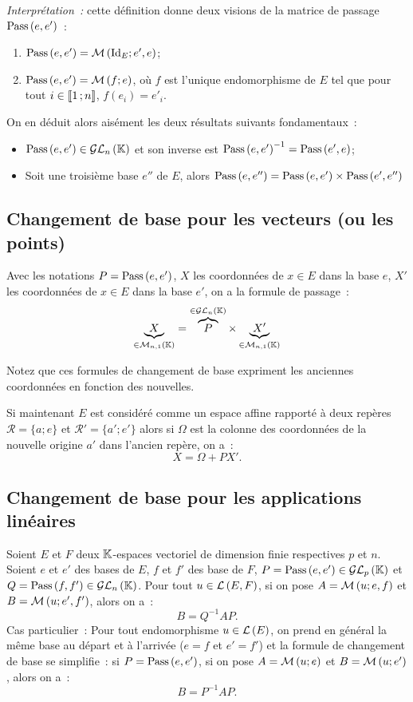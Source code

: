 \emph{Interprétation~:} cette définition donne deux visions de la matrice de passage $\text{Pass}\left(e,e'\right)$~:
\begin{enumerate}
	\item $\text{Pass}\left(e,e'\right) = \mathcal{M}\left(\operatorname{Id}_E;e',e\right)$;
	\item $\text{Pass}\left(e,e'\right) = \mathcal{M}\left(f;e\right)$, où $f$ est l'unique endomorphisme de $E$ tel que pour tout $i \in \mathopen{\llbracket}1\mathclose{}\mathpunct{};n\mathclose{\rrbracket}$, $f(e_i)=e'_i$.
\end{enumerate}

On en déduit alors aisément les deux résultats suivants fondamentaux~:
\begin{itemize}
	\item $\text{Pass}\left(e,e'\right) \in \mathcal{GL}_{n}\left(\mathbb{K}\right)$ et son inverse est $\text{Pass}\left(e,e'\right)^{-1} = \text{Pass}\left(e',e\right)$;
	\item Soit une troisième base $e''$ de $E$, alors $\text{Pass}\left(e,e''\right) = \text{Pass}\left(e,e'\right) \times \text{Pass}\left(e',e''\right)$
\end{itemize}
\subsection{Changement de base pour les vecteurs (ou les points)}
Avec les notations $P = \text{Pass}\left(e,e'\right)$, $X$ les coordonnées de $x \in E$ dans la base $e$, $X'$ les coordonnées de $x \in E$ dans la base $e'$, on a la formule de passage~:
\begin{equation}
	\underbrace{X}_{\in \mathcal{M}_{n,1}\left(\mathbb{K}\right)} = \overbrace{P}^{\in \mathcal{GL}_{n}\left(\mathbb{K}\right)} \times \underbrace{X'}_{\in \mathcal{M}_{n,1}\left(\mathbb{K}\right)}
\end{equation}

Notez que ces formules de changement de base expriment les anciennes coordonnées en fonction des nouvelles.

Si maintenant $E$ est considéré comme un espace affine rapporté à deux repères $\mathcal{R} = \{a;e\}$ et $\mathcal{R'} = \{a';e'\}$ alors si $\Omega$ est la colonne des coordonnées de la nouvelle origine $a'$ dans l'ancien repère, on a~:
\begin{equation}
	X = \Omega +PX'.
\end{equation}

\subsection{Changement de base pour les applications linéaires}
Soient $E$ et $F$ deux $\mathbb{K}$-espaces vectoriel de dimension finie respectives $p$ et $n$. Soient $e$ et $e'$ des bases de $E$, $f$ et $f'$ des base de $F$, $P = \text{Pass}\left(e,e'\right) \in \mathcal{GL}_{p}\left(\mathbb{K}\right)$ et $Q = \text{Pass}\left(f,f'\right) \in \mathcal{GL}_{n}\left(\mathbb{K}\right)$.
Pour tout $u \in \mathcal{L}\left(E,F\right)$, si on pose $A = \mathcal{M}\left(u;e,f\right)$ et $B = \mathcal{M}\left(u;e',f'\right)$, alors on a~:
\begin{equation}
	B=Q^{-1} A P.
\end{equation}
Cas particulier~: Pour tout endomorphisme $u \in\mathcal{L}\left(E\right)$, on prend en général la même base au départ et à l'arrivée ($e=f$ et $e'=f'$) et la formule de changement de base se simplifie~: si $P = \text{Pass}\left(e,e'\right)$, si on pose $A = \mathcal{M}\left(u;e\right)$ et $B = \mathcal{M}\left(u;e'\right)$, alors on a~:
\begin{equation}
	B=P^{-1} A P.
\end{equation}